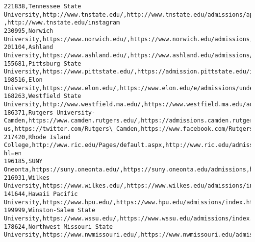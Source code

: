 \documentclass[11pt]{article}
\begin{document}
\begin{Verbatim}[commandchars=\\\{\}]
221838,Tennessee State University,http://www.tnstate.edu/,http://www.tnstate.edu/admissions/apply.aspx,http://www.tnstate.edu/twitter,http://www.tnstate.edu/facebook ,http://www.tnstate.edu/instagram
230995,Norwich University,https://www.norwich.edu/,https://www.norwich.edu/admissions,http://twitter.com/norwichnews,http://facebook.com/NorwichUniversity,https://www.instagram.com/norwichuniversity/
201104,Ashland University,https://www.ashland.edu/,https://www.ashland.edu/admissions/,https://twitter.com/Ashland\_Univ,http://www.facebook.com/121733227868116/posts/2343222605719156,https://instagram.com/ashland\_university
155681,Pittsburg State University,https://www.pittstate.edu/,https://admission.pittstate.edu/index.html,https://www.twitter.com/pittstate,https://www.facebook.com/pittstate,https://www.instagram.com/pittsburg\_state
198516,Elon University,https://www.elon.edu/,https://www.elon.edu/e/admissions/undergraduate/,http://www.twitter.com/elonuniversity,http://www.facebook.com/ElonUniversity,http://www.instagram.com/elonuniversity
168263,Westfield State University,http://www.westfield.ma.edu/,https://www.westfield.ma.edu/admissions,https://twitter.com/westfieldstate,http://www.facebook.com/WestfieldStateUniversity,https://www.instagram.com/westfieldstate/
186371,Rutgers University-Camden,https://www.camden.rutgers.edu/,https://admissions.camden.rutgers.edu/contact-us,https://twitter.com/Rutgers\_Camden,https://www.facebook.com/RutgersCamden,http://instagram.com/rutgers\_camden
217420,Rhode Island College,http://www.ric.edu/Pages/default.aspx,http://www.ric.edu/admissions/Pages/default.aspx,https://twitter.com/RICNews/,https://www.facebook.com/rhodeislandcollege,http://www.instagram.com/rhodeislandcollege/?hl=en
196185,SUNY Oneonta,https://suny.oneonta.edu/,https://suny.oneonta.edu/admissions,https://twitter.com/SUNY\_Oneonta,https://www.facebook.com/SUNYOneonta,https://www.instagram.com/sunyoneonta/
216931,Wilkes University,https://www.wilkes.edu/,https://www.wilkes.edu/admissions/index.aspx,https://twitter.com/wilkesU,https://www.facebook.com/WilkesUniversity,https://instagram.com/wilkesu
141644,Hawaii Pacific University,https://www.hpu.edu/,https://www.hpu.edu/admissions/index.html,https://twitter.com/hpu,https://www.facebook.com/hawaiipacific,https://www.instagram.com/hawaiipacificuniversity/
199999,Winston-Salem State University,https://www.wssu.edu/,https://www.wssu.edu/admissions/index.html,https://www.twitter.com/WSSURAMS,https://www.facebook.com/WSSU1892,https://www.instagram.com/p/BpXF7K2g5N6/
178624,Northwest Missouri State University,https://www.nwmissouri.edu/,https://www.nwmissouri.edu/admissions/,https://www.twitter.com/KNWT8,https://www.facebook.com/nwmissouri,https://instagram.com/nwmostate/

\end{Verbatim}
\end{document}
